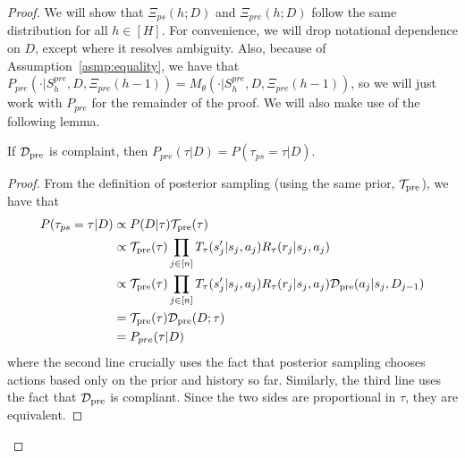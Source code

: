\begin{proof}
We will show that $\Xi_{ps} (h; D)$ and $\Xi_{pre}(h; D)$ follow the same distribution for all $h \in [H]$. For  convenience, we will drop notational dependence on $D$, except where it resolves ambiguity. Also, because of Assumption~\ref{asmp:equality}, we have that $P_{pre}(\cdot | S^{pre}_h, D, \Xi_{pre}(h - 1)) = M_{\theta} (\cdot | S^{pre}_h, D, \Xi_{pre}(h - 1))$, so we will just work with $P_{pre}$ for the remainder of the proof. We will also make use of the following lemma.
\begin{lemma}\label{lem:compliance}
    If $\mathcal{D}_{\text{pre}}$ is complaint, then $P_{pre} (\tau | D) = P(\tau_{ps} = \tau | D)$.
\end{lemma}
\begin{proof}
From the definition of posterior sampling (using the same prior, ${\mathcal{T}}_{\text{pre}}$), we have that
    \begin{align}
            P(\tau_{ps}  = \tau | D) & \propto P(D | \tau) {\mathcal{T}}_{\text{pre}}(\tau) \\
            & \propto {\mathcal{T}}_{\text{pre}}(\tau) \prod_{j \in [n]} T_{\tau}(s'_j  | s_j, a_j) R_\tau(r_j | s_j, a_j)  \\
            & \propto {\mathcal{T}}_{\text{pre}}(\tau) \prod_{j \in [n]} T_{\tau}(s'_j  | s_j, a_j) R_\tau(r_j | s_j, a_j) \mathcal{D}_{\text{pre}}(a_j | s_j, D_{j - 1}) \\
            & = {\mathcal{T}}_{\text{pre}}(\tau) \mathcal{D}_{\text{pre}}(D; \tau) \\
            & = P_{pre}(\tau | D)
    \end{align}
where the second line crucially uses the fact that posterior sampling chooses actions based only on the prior and history so far. Similarly, the third line uses the fact that $\mathcal{D}_{\text{pre}}$ is compliant. Since the two sides are proportional in $\tau$, they are equivalent.
\end{proof}




\end{proof}
